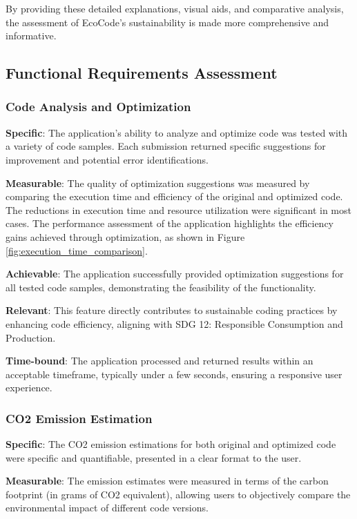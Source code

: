 \documentclass[conference,compsoc]{IEEEtran}
\begin{document}
By providing these detailed explanations, visual aids, and comparative analysis, the assessment of EcoCode's sustainability is made more comprehensive and informative.

\subsection{Functional Requirements Assessment}
\subsubsection{Code Analysis and Optimization}

\textbf{Specific}: The application's ability to analyze and optimize code was tested with a variety of code samples. Each submission returned specific suggestions for improvement and potential error identifications.

\textbf{Measurable}: The quality of optimization suggestions was measured by comparing the execution time and efficiency of the original and optimized code. The reductions in execution time and resource utilization were significant in most cases. The performance assessment of the application highlights the efficiency gains achieved through optimization, as shown in Figure \ref{fig:execution_time_comparison}.

\textbf{Achievable}: The application successfully provided optimization suggestions for all tested code samples, demonstrating the feasibility of the functionality.

\textbf{Relevant}: This feature directly contributes to sustainable coding practices by enhancing code efficiency, aligning with SDG 12: Responsible Consumption and Production.

\textbf{Time-bound}: The application processed and returned results within an acceptable timeframe, typically under a few seconds, ensuring a responsive user experience.

\subsubsection{CO2 Emission Estimation}
\textbf{Specific}: The CO2 emission estimations for both original and optimized code were specific and quantifiable, presented in a clear format to the user.

\textbf{Measurable}: The emission estimates were measured in terms of the carbon footprint (in grams of CO2 equivalent), allowing users to objectively compare the environmental impact of different code versions.
\end{document}
